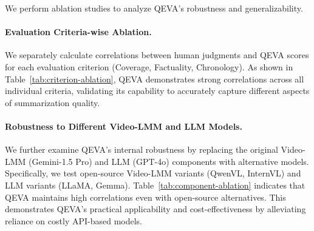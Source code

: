 We perform ablation studies to analyze QEVA's robustness and generalizability.

\paragraph{Evaluation Criteria-wise Ablation.} 
We separately calculate correlations between human judgments and QEVA scores for each evaluation criterion (Coverage, Factuality, Chronology). As shown in Table~\ref{tab:criterion-ablation}, QEVA demonstrates strong correlations across all individual criteria, validating its capability to accurately capture different aspects of summarization quality.




\paragraph{Robustness to Different Video-LMM and LLM Models.} 
We further examine QEVA's internal robustness by replacing the original Video-LMM (Gemini-1.5 Pro) and LLM (GPT-4o) components with alternative models. Specifically, we test open-source Video-LMM variants (QwenVL, InternVL) and LLM variants (LLaMA, Gemma). Table~\ref{tab:component-ablation} indicates that QEVA maintains high correlations even with open-source alternatives. This demonstrates QEVA's practical applicability and cost-effectiveness by alleviating reliance on costly API-based models.

